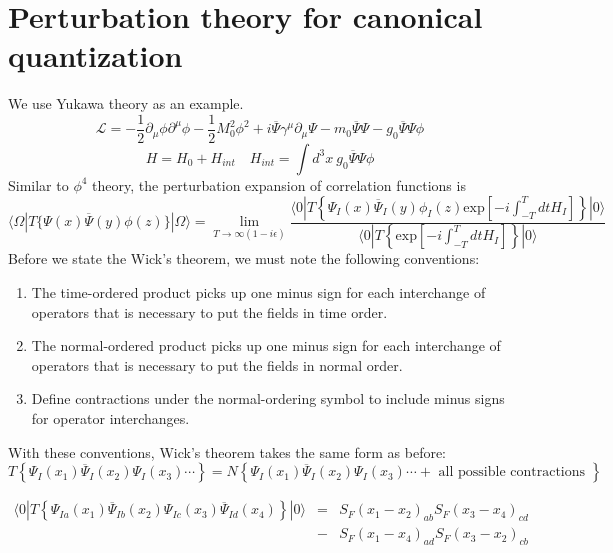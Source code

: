 \section{Perturbation theory for canonical quantization}
\noindent
We use Yukawa theory as an example.
\[\mathcal{L} = -\frac{1}{2}\partial_{\mu} \phi \partial^{\mu} \phi -\frac{1}{2}M_0^2 \phi^2 + i\overline{\Psi} \gamma^{\mu} \partial_{\mu} \Psi - m_0\overline{\Psi}\Psi -g_0 \overline{\Psi}\Psi\phi\]
\[H = H_0 + H_{int} \quad H_{int} = \int d^3 x \: g_0 \overline{\Psi}\Psi\phi \]
Similar to $\phi^4$ theory, the perturbation expansion of correlation functions is
\[\langle \Omega | T \{\Psi(x) \overline{\Psi}(y) \phi(z) \} | \Omega \rangle = \lim_{T \to \infty(1-i\epsilon)} \frac{\langle 0 | T \left\{ \Psi_I(x) \overline{\Psi}_I(y) \phi_I(z) \mathrm{exp} \left[ -i \int_{-T}^{T} dt H_I \right]\right\} | 0 \rangle}{\langle 0 | T \left\{ \mathrm{exp} \left[ -i \int_{-T}^{T} dt H_I \right]\right\} | 0 \rangle}\]
Before we state the Wick's theorem, we must note the following conventions:
\begin{enumerate}
\item  The time-ordered product picks up one minus sign for each interchange of operators that is necessary to put the fields in time order.
\item The normal-ordered product picks up one minus sign for each interchange of operators that is necessary to put the fields in normal order.
\item Define contractions under the normal-ordering symbol to include minus signs for operator interchanges.
\end{enumerate}
With these conventions, Wick's theorem takes the same form as before:
\[T \left\{ \Psi_I(x_1) \overline{\Psi}_I(x_2)  \Psi_I(x_3) \cdots \right\} = N \left\{\Psi_I(x_1) \overline{\Psi}_I(x_2)  \Psi_I(x_3) \cdots + \mbox{ all possible contractions }\right\} \]
\begin{example}
\begin{eqnarray}
\langle 0 | T \left\{ \Psi_{Ia}(x_1) \overline{\Psi}_{Ib}(x_2) \Psi_{Ic}(x_3) \overline{\Psi}_{Id}(x_4)\right\}| 0 \rangle &=& S_F(x_1-x_2)_{ab}S_F(x_3-x_4)_{cd} \nonumber \\
&-& S_F(x_1-x_4)_{ad}S_F(x_3-x_2)_{cb} \nonumber
\end{eqnarray}
\end{example}

